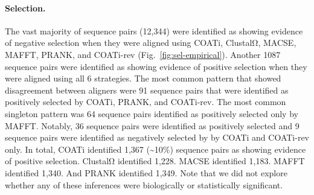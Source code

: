 \documentclass[12pt,letterpaper]{article}
\begin{document}
\paragraph{Selection.}

The vast majority of sequence pairs (12,344) were identified as showing evidence of negative selection when they were aligned using COATi, ClustalΩ, MACSE, MAFFT, PRANK, and COATi-rev (Fig.~\ref{fig:sel-empirical}). Another 1087 sequence pairs were identified as showing evidence of positive selection when they were aligned using all 6 strategies. The most common pattern that showed disagreement between aligners were 91 sequence pairs that were identified as positively selected by COATi, PRANK, and COATi-rev. The most common singleton pattern was 64 sequence pairs identified as positively selected only by MAFFT. Notably, 36 sequence pairs were identified as positively selected and 9 sequence pairs were identified as negatively selected by by COATi and COATi-rev only.
%
In total, COATi identified 1,367 (\sim{}10\%) sequence pairs as showing evidence of positive selection. ClustalΩ identified 1,228. MACSE identified 1,183. MAFFT identified 1,340. And PRANK identified 1,349. Note that we did not explore whether any of these inferences were biologically or statistically significant.
\end{document}
